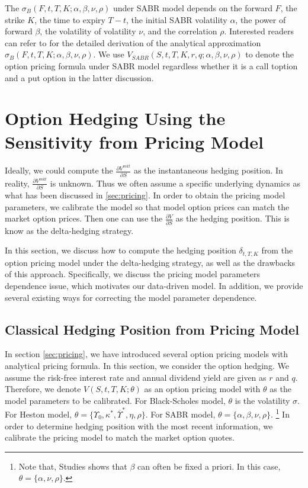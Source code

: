 \documentclass[letterpaper,12pt,titlepage,oneside,final]{book}
\numberwithin{equation}{section}
\theoremstyle{definition}
\newcommand{\Vmkt}{V^{mkt}}
\begin{document}
The $\sigma_{B}(F,t,T,K;\alpha,\beta,\nu,\rho)$ under SABR model depends on the forward $F$, the strike $K$, the time to expiry $T-t$, the initial SABR volatility $\alpha$, the power of forward $\beta$, the volatility of volatility $\nu$, and the correlation $\rho$.  Interested readers can refer to \cite{hagan2002managing} for the detailed derivation of the analytical approximation $\sigma_{B}(F,t,T,K;\alpha,\beta,\nu,\rho)$.  We use $V_{SABR}(S,t,T,K,r,q;\alpha,\beta,\nu,\rho)$ to denote the option pricing formula under SABR model regardless whether it is a call toption and a put option  in the latter discussion.



\section{Option Hedging Using the Sensitivity from Pricing Model}
 Ideally, we could compute the $\frac{\partial \Vmkt}{\partial S}$ as the instantaneous hedging position. In reality, $\frac{\partial \Vmkt}{\partial S}$ is unknown. Thus we often assume a specific underlying dynamics as what has been discussed in \ref{sec:pricing}. In order to obtain the pricing model parameters, we calibrate the model so that model option prices can match the market option prices. Then one can use the $\frac{\partial V}{\partial S}$ as the hedging position. This is know as the delta-hedging strategy.

 In this section, we discuss how to compute the hedging position $\delta_{t,T,K}$ from the option pricing model under the delta-hedging strategy, as well as the drawbacks of this approach.  Specifically, we discuss the pricing model parameters dependence issue, which motivates our data-driven model. In addition, we provide several existing ways for correcting the model parameter dependence. 


\subsection{Classical Hedging Position from Pricing Model}
\label{sec:Classical}
In section \ref{sec:pricing}, we have introduced several option pricing models with analytical pricing formula. In this section, we consider the option hedging.  We assume the risk-free interest rate and annual dividend yield are given as $r$ and $q$. Therefore, we denote  $V(S,t,T,K;\theta)$  as an option pricing model with $\theta$ as the model parameters to be calibrated. For Black-Scholes model,  $\theta$ is the volatility $\sigma$. For Heston model, $\theta=\{\Upsilon_0,\kappa^*,\overline{\Upsilon}^*,\eta,\rho \}$. For SABR model, $\theta=\{\alpha,\beta,\nu,\rho \}$. \footnote{Note that, Studies \cite{hulloptimal,hagan2002managing,hagan2017bartlett} shows that $\beta$ can often be fixed a priori. In this case, $\theta=\{\alpha,\nu,\rho \}$.} In order to determine hedging position with the most recent information, we calibrate the pricing model to match the market option quotes. 
\end{document}
